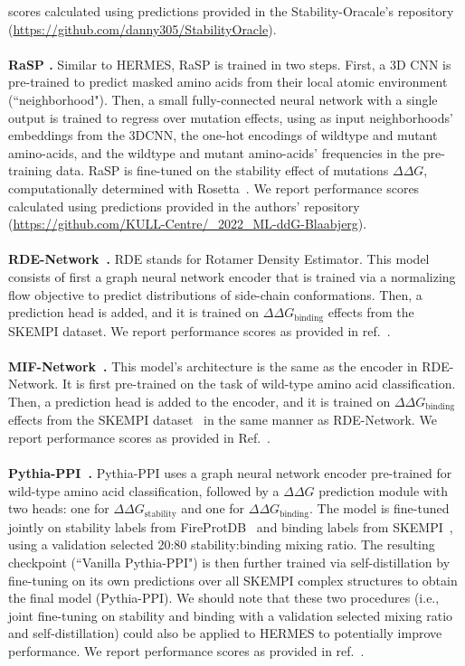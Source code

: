 scores calculated using predictions provided in the Stability-Oracale's repository
(\url{https://github.com/danny305/StabilityOracle}).\\
\\
\noindent \textbf{RaSP \citep{blaabjerg_rapid_2023}.} Similar to HERMES, RaSP is trained in two
steps. First, a 3D CNN is pre-trained to predict masked amino acids from their local atomic
environment (``neighborhood"). Then, a small fully-connected neural network with a single output is
trained to regress over mutation effects, using as input neighborhoods' embeddings from the 3DCNN,
the one-hot encodings of wildtype and mutant amino-acids, and the wildtype and mutant amino-acids'
frequencies in the pre-training data.
RaSP is fine-tuned on the stability effect of mutations $\Delta\Delta G$, computationally determined
with Rosetta~\citep{chaudhury_pyrosetta_2010}. We report performance scores calculated using
predictions provided in the authors' repository
(\url{https://github.com/KULL-Centre/_2022_ML-ddG-Blaabjerg}).\\
\\
\textbf{RDE-Network~\citep{luo_rotamer_2022}.} RDE stands for Rotamer Density Estimator. This model
consists of first a graph neural network encoder that is trained via a normalizing flow objective to
predict distributions of side-chain conformations. Then, a prediction head is added, and it is
trained on $\Delta\Delta G_{\text{binding}}$ effects from the SKEMPI dataset. We report performance
scores as provided in ref.~\citep{luo_rotamer_2022}.
\\
\\
\textbf{MIF-Network~\citep{luo_rotamer_2022}.} This model's architecture is the same as the encoder
in RDE-Network. It is first pre-trained on the task of wild-type amino acid classification. Then, a
prediction head is added to the encoder, and it is trained on $\Delta\Delta G_{\text{binding}}$
effects from the SKEMPI dataset~\citep{jankauskaite_skempi_2019} in the same manner as RDE-Network.
We report performance scores as provided in Ref.~\citep{luo_rotamer_2022}.\\
\\
\textbf{Pythia-PPI~\citep{tao_reliable_2025}.} Pythia-PPI uses a graph neural network encoder
pre-trained for wild-type amino acid classification, followed by a $\Delta\Delta G$ prediction
module with two heads: one for $\Delta\Delta G_{\text{stability}}$ and one for $\Delta\Delta
G_{\text{binding}}$. The model is fine-tuned jointly on stability labels from
FireProtDB~\citep{stourac_fireprotdb_2021} and binding labels from
SKEMPI~\citep{jankauskaite_skempi_2019}, using a validation selected 20:80 stability:binding mixing
ratio. The resulting checkpoint (``Vanilla Pythia-PPI") is then further trained via
self-distillation by fine-tuning on its own predictions over all SKEMPI complex structures to obtain
the final model (Pythia-PPI). We should note that these two procedures (i.e., joint fine-tuning on
stability and binding with a validation selected mixing ratio and self-distillation) could also be
applied to HERMES to potentially improve performance. We report performance scores as provided in
ref.~\citep{tao_reliable_2025}.


